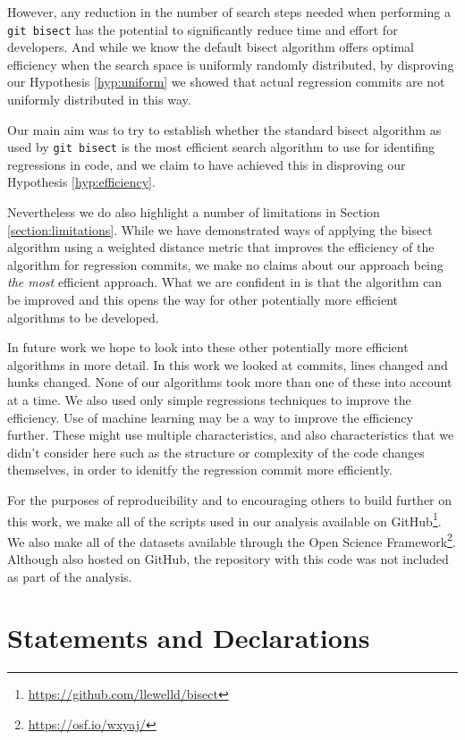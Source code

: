 \documentclass[pdflatex, sn-mathphys, referee]{sn-jnl}%
\theoremstyle{thmstyleone}%
\theoremstyle{thmstyletwo}%
\theoremstyle{thmstylethree}%
\def\code{\tt}
\theoremstyle{thmstyleone}
\begin{document}
However, any reduction in the number of search steps needed when performing a {\code git bisect} has the potential to significantly reduce time and effort for developers. And while we know the default bisect algorithm offers optimal efficiency when the search space is uniformly randomly distributed, by disproving our Hypothesis \ref{hyp:uniform} we showed that actual regression commits are not uniformly distributed in this way.

Our main aim was to try to establish whether the standard bisect algorithm as used by {\code git bisect} is the most efficient search algorithm to use for identifing regressions in code, and we claim to have achieved this in disproving our Hypothesis \ref{hyp:efficiency}.

Nevertheless we do also highlight a number of limitations in Section \ref{section:limitations}. While we have demonstrated ways of applying the bisect algorithm using a weighted distance metric that improves the efficiency of the algorithm for regression commits, we make no claims about our approach being {\it the most\/} efficient approach. What we are confident in is that the algorithm can be improved and this opens the way for other potentially more efficient algorithms to be developed.

In future work we hope to look into these other potentially more efficient algorithms in more detail. In this work we looked at commits, lines changed and hunks changed. None of our algorithms took more than one of these into account at a time. We also used only simple regressions techniques to improve the efficiency. Use of machine learning may be a way to improve the efficiency further. These might use multiple characteristics, and also characteristics that we didn't consider here such as the structure or complexity of the code changes themselves, in order to idenitfy the regression commit more efficiently.

For the purposes of reproducibility and to encouraging others to build further on this work, we make all of the scripts used in our analysis available on GitHub\footnote{\url{https://github.com/llewelld/bisect}}. We also make all of the datasets available through the Open Science Framework\footnote{\url{https://osf.io/wxyaj/}}. Although also hosted on GitHub, the repository with this code was not included as part of the analysis.

\section{Statements and Declarations}
\end{document}
